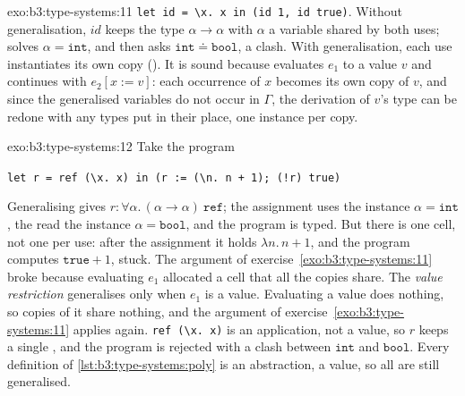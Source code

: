 \begin{solution}{exo:b3:type-systems:11}
\texttt{let id = \textbackslash{}x.\ x in (id 1, id true)}. Without generalisation, $\mathit{id}$ keeps the type $\alpha \to \alpha$ with $\alpha$ a variable shared by both uses;  solves $\alpha = \mathtt{int}$, and  then asks $\mathtt{int} \doteq \mathtt{bool}$, a clash. With generalisation, each use instantiates its own copy (). It is sound because  evaluates $e_1$ to a value $v$ and continues with $e_2[x := v]$: each occurrence of $x$ becomes its own copy of $v$, and since the generalised variables do not occur in $\Gamma$, the derivation of $v$'s type can be redone with any types put in their place, one instance per copy.
\end{solution}

\begin{solution}{exo:b3:type-systems:12}
Take the program
\begin{center}\texttt{let r = ref (\textbackslash{}x.\ x) in (r :=\ (\textbackslash{}n.\ n + 1); (!r) true)}\end{center}
Generalising gives $r : \forall \alpha.\,(\alpha \to \alpha)\ \mathtt{ref}$; the assignment uses the instance $\alpha = \mathtt{int}$, the read the instance $\alpha = \mathtt{bool}$, and the program is typed. But there is one cell, not one per use: after the assignment it holds $\lambda n.\,n + 1$, and the program computes $\mathtt{true} + 1$, stuck. The argument of exercise~\ref{exo:b3:type-systems:11} broke because evaluating $e_1$ allocated a cell that all the copies share. The \emph{value restriction} generalises  only when $e_1$ is a value. Evaluating a value does nothing, so copies of it share nothing, and the argument of exercise~\ref{exo:b3:type-systems:11} applies again. \texttt{ref (\textbackslash{}x.\ x)} is an application, not a value, so $r$ keeps a single , and the program is rejected with a clash between $\mathtt{int}$ and $\mathtt{bool}$. Every definition of \cref{lst:b3:type-systems:poly} is an abstraction, a value, so all are still generalised.
\end{solution}

